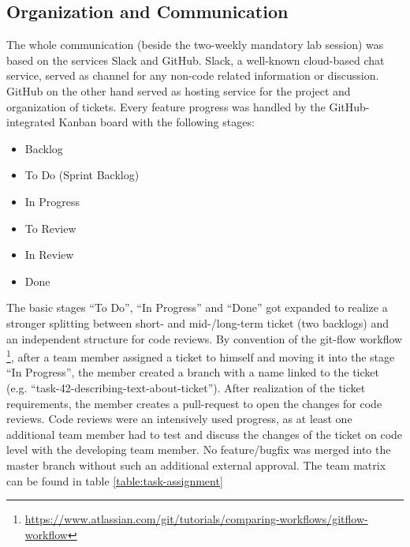 \subsection{Organization and Communication}
The whole communication (beside the two-weekly mandatory lab session) was based on the services Slack and GitHub. Slack, a well-known cloud-based chat service, served as channel for any non-code related information or discussion. GitHub on the other hand served as hosting service for the project and organization of tickets. Every feature progress was handled by the GitHub-integrated Kanban board with the following stages:
\begin{itemize}
	\item Backlog
	\item To Do (Sprint Backlog)
	\item In Progress
	\item To Review
	\item In Review
	\item Done
\end{itemize}

The basic stages “To Do”, “In Progress” and “Done” got expanded to realize a stronger splitting between short- and mid-/long-term ticket (two backlogs) and an independent structure for code reviews.
By convention of the git-flow workflow \footnote{\url{https://www.atlassian.com/git/tutorials/comparing-workflows/gitflow-workflow}}, after a team member assigned a ticket to himself and moving it into the stage “In Progress”, the member created a branch with a name linked to the ticket (e.g. “task-42-describing-text-about-ticket”). After realization of the ticket requirements, the member creates a pull-request to open the changes for code reviews.
Code reviews were an intensively used progress, as at least one additional team member had to test and discuss the changes of the ticket on code level with the developing team member. No feature/bugfix was merged into the master branch without such an additional external approval. The team matrix can be found in table \ref{table:task-assignment}

